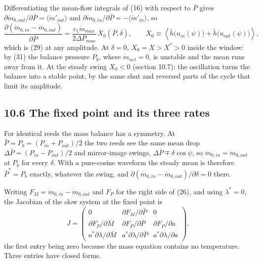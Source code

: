 \documentclass[11pt]{article}
\begin{document}
Differentiating the mean-flow integrals of (16) with respect to $\bar P$ gives $\partial\dot m_{0,out}/\partial\bar P = \langle\dot m'_{out}\rangle$ and $\partial\dot m_{0,in}/\partial\bar P = -\langle\dot m'_{in}\rangle$, so
\begin{equation}
\frac{\partial\left(\dot m_{0,in} - \dot m_{0,out}\right)}{\partial\bar P} = \frac{c_1\dot m_{max}}{2\Delta P_{max}}\,X_0(\bar P,\delta), \qquad
X_0 \equiv \left\langle\tilde h\big(u_{in}(\psi)\big) + \tilde h\big(u_{out}(\psi)\big)\right\rangle , \tag{39}
\end{equation}
which is (29) at any amplitude. At $\delta = 0$, $X_0 = X > X^* > 0$ inside the window: by (31) the balance pressure $P_b$, where $\dot m_{net} = 0$, is unstable and the mean runs away from it. At the steady swing $X_0 < 0$ (section 10.7): the oscillation turns the balance into a stable point, by the same shut and reversed parts of the cycle that limit its amplitude.

\subsection*{10.6 The fixed point and its three rates}

For identical reeds the mass balance has a symmetry. At $\bar P = P_b = (P_{in} + P_{out})/2$ the two reeds see the same mean drop $\Delta\bar P = (P_{in} - P_{out})/2$ and mirror-image swings, $\Delta\bar P \mp \delta\cos\psi$, so $\dot m_{0,in} = \dot m_{0,out}$ at $P_b$ for every $\delta$. With a pure-cosine waveform the steady mean is therefore $\bar P^* = P_b$ exactly, whatever the swing, and $\partial(\dot m_{0,in} - \dot m_{0,out})/\partial\delta = 0$ there.

Writing $F_M = \dot m_{0,in} - \dot m_{0,out}$ and $F_P$ for the right side of (26), and using $\lambda^* = 0$, the Jacobian of the slow system at the fixed point is
\begin{equation}
J = \begin{pmatrix} 0 & \partial F_M/\partial\bar P & 0 \\[2pt] \partial F_P/\partial\bar M & \partial F_P/\partial\bar P & \partial F_P/\partial a \\[2pt] a^*\partial\lambda/\partial\bar M & a^*\partial\lambda/\partial\bar P & a^*\partial\lambda/\partial a \end{pmatrix} , \tag{40}
\end{equation}
the first entry being zero because the mass equation contains no temperature. Three entries have closed forms.
\end{document}
